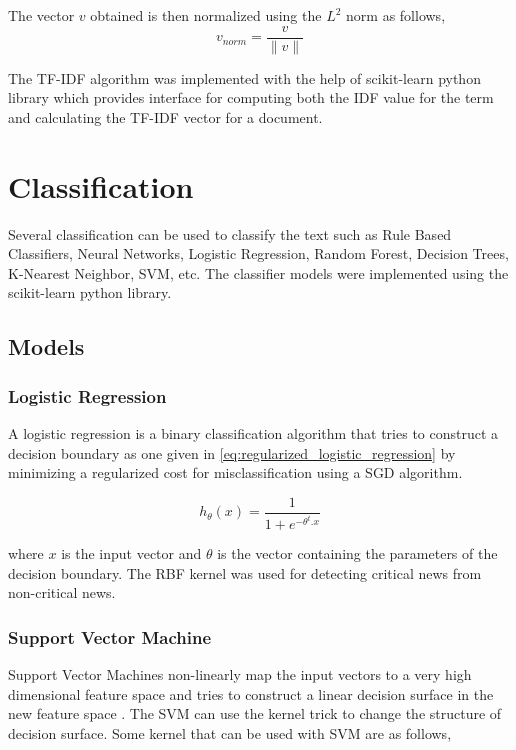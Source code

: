 The vector $v$ obtained is then normalized using the $L^2$ norm as follows,
\begin{equation}
    v_{norm} = \frac{v}{\lVert v \rVert}
\end{equation}

The TF-IDF algorithm was implemented with the help of scikit-learn \cite{scikit-learn} python library which provides interface for computing both the IDF value for the term and calculating the TF-IDF vector for a document.

\section{Classification}\label{classification}
Several classification can be used to classify the text such as Rule Based Classifiers, Neural Networks, Logistic Regression, Random Forest, Decision Trees, K-Nearest Neighbor, SVM\cite{cortes1995support}, etc. 
The classifier models were implemented using the scikit-learn python library.

\subsection{Models}
\subsubsection{Logistic Regression}
A logistic regression is a binary classification algorithm that tries to construct a decision boundary as one given in \eqref{eq:regularized_logistic_regression} by minimizing a regularized cost for misclassification using a SGD algorithm.

\begin{equation}
    \label{eq:regularized_logistic_regression}
    h_{\theta}(x) = \frac{1}{1 + {e}^{-{\theta}^{t}. x}}
\end{equation}

where $x$ is the input vector and $\theta$ is the vector containing the parameters of the decision boundary. The RBF kernel was used for detecting critical news from non-critical news.

\subsubsection{Support Vector Machine}
Support Vector Machines non-linearly map the input vectors to a very high dimensional feature space and tries to construct a linear decision surface in the new feature space \cite{cortes1995support}. The SVM can use the kernel trick to change the structure of decision surface\cite{cortes1995support}. Some kernel that can be used with SVM are as follows,

